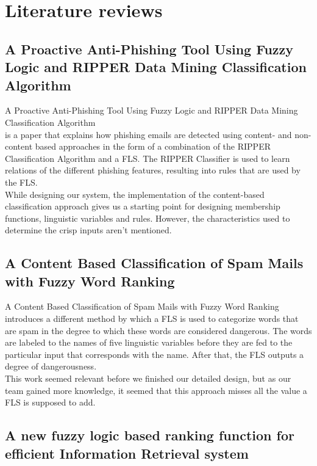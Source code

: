 \documentclass[journal]{IEEEtran}
\begin{document}
\section{Literature reviews}

\subsection{A Proactive Anti-Phishing Tool Using Fuzzy Logic and RIPPER Data Mining Classification Algorithm}

A Proactive Anti-Phishing Tool Using Fuzzy Logic and RIPPER Data Mining 
Classification Algorithm \cite{phishing} \\ is a paper that explains how 
phishing emails are detected using content- and non-content based approaches 
in the form of a combination of the RIPPER Classification Algorithm and a FLS. 
The RIPPER Classifier is used to learn relations of the different phishing 
features, resulting into rules that are used by the FLS. \\

While designing our system, the implementation of the content-based 
classification approach gives us a starting point for designing membership 
functions, linguistic variables and rules. However, the characteristics used 
to determine the crisp inputs aren't mentioned.

\subsection{A Content Based Classification of Spam Mails with Fuzzy Word Ranking}

A Content Based Classification of Spam Mails with Fuzzy Word Ranking
\cite{spam} introduces a different method by which a FLS is used to categorize 
words that are spam in the degree to which these words are considered 
dangerous. The words are labeled to the names of five linguistic variables 
before they are fed to the particular input that corresponds with the name. 
After that, the FLS outputs a degree of dangerousness. \\

This work seemed relevant before we finished our detailed design, but as our 
team gained more knowledge, it seemed that this approach misses all the value 
a FLS is supposed to add.

\subsection{A new fuzzy logic based ranking function for efficient Information Retrieval system}
\end{document}
